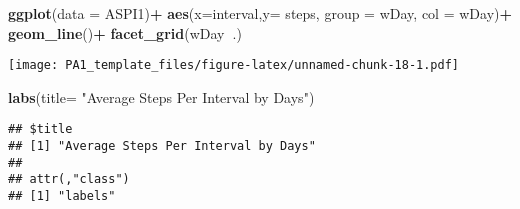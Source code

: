 \documentclass[
]{article}
\newenvironment{Shaded}{\begin{snugshade}}{\end{snugshade}}
\newcommand{\DataTypeTok}[1]{\textcolor[rgb]{0.13,0.29,0.53}{#1}}
\newcommand{\KeywordTok}[1]{\textcolor[rgb]{0.13,0.29,0.53}{\textbf{#1}}}
\newcommand{\NormalTok}[1]{#1}
\newcommand{\OperatorTok}[1]{\textcolor[rgb]{0.81,0.36,0.00}{\textbf{#1}}}
\newcommand{\StringTok}[1]{\textcolor[rgb]{0.31,0.60,0.02}{#1}}
\begin{document}
\begin{Shaded}
\begin{Highlighting}[]
\KeywordTok{ggplot}\NormalTok{(}\DataTypeTok{data =}\NormalTok{ ASPI1)}\OperatorTok{+}
\StringTok{  }\KeywordTok{aes}\NormalTok{(}\DataTypeTok{x=}\NormalTok{interval,}\DataTypeTok{y=}\NormalTok{ steps, }\DataTypeTok{group =}\NormalTok{ wDay, }\DataTypeTok{col =}\NormalTok{ wDay)}\OperatorTok{+}
\StringTok{  }\KeywordTok{geom_line}\NormalTok{()}\OperatorTok{+}
\StringTok{  }\KeywordTok{facet_grid}\NormalTok{(wDay}\OperatorTok{~}\NormalTok{.)}
\end{Highlighting}
\end{Shaded}

\texttt{[image: PA1\_template\_files/figure-latex/unnamed-chunk-18-1.pdf]}

\begin{Shaded}
\begin{Highlighting}[]
  \KeywordTok{labs}\NormalTok{(}\DataTypeTok{title=} \StringTok{"Average Steps Per Interval by Days"}\NormalTok{) }
\end{Highlighting}
\end{Shaded}

\begin{verbatim}
## $title
## [1] "Average Steps Per Interval by Days"
## 
## attr(,"class")
## [1] "labels"
\end{verbatim}
\end{document}
